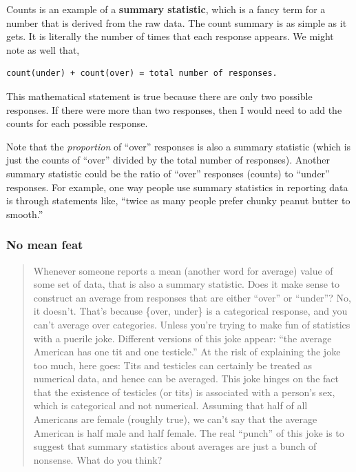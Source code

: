 \documentclass[
  openany]{book}
\begin{document}
Counts is an example of a \textbf{summary statistic}, which is a fancy term for a number that is derived from the raw data. The count summary is as simple as it gets. It is literally the number of times that each response appears. We might note as well that,

\begin{verbatim}
count(under) + count(over) = total number of responses.
\end{verbatim}

This mathematical statement is true because there are only two possible responses. If there were more than two responses, then I would need to add the counts for each possible response.

Note that the \emph{proportion} of ``over'' responses is also a summary statistic (which is just the counts of ``over'' divided by the total number of responses). Another summary statistic could be the ratio of ``over'' responses (counts) to ``under'' responses. For example, one way people use summary statistics in reporting data is through statements like, ``twice as many people prefer chunky peanut butter to smooth.''

\hypertarget{no-mean-feat}{%
\subsubsection*{No mean feat}\label{no-mean-feat}}

\begin{quote}
Whenever someone reports a mean (another word for average) value of some set of data, that is also a summary statistic. Does it make sense to construct an average from responses that are either ``over'' or ``under''? No, it doesn't. That's because \{over, under\} is a categorical response, and you can't average over categories. Unless you're trying to make fun of statistics with a puerile joke. Different versions of this joke appear: ``the average American has one tit and one testicle.'' At the risk of explaining the joke too much, here goes: Tits and testicles can certainly be treated as numerical data, and hence can be averaged. This joke hinges on the fact that the existence of testicles (or tits) is associated with a person's sex, which is categorical and not numerical. Assuming that half of all Americans are female (roughly true), we can't say that the average American is half male and half female. The real ``punch'' of this joke is to suggest that summary statistics about averages are just a bunch of nonsense. What do you think?
\end{quote}
\end{document}
